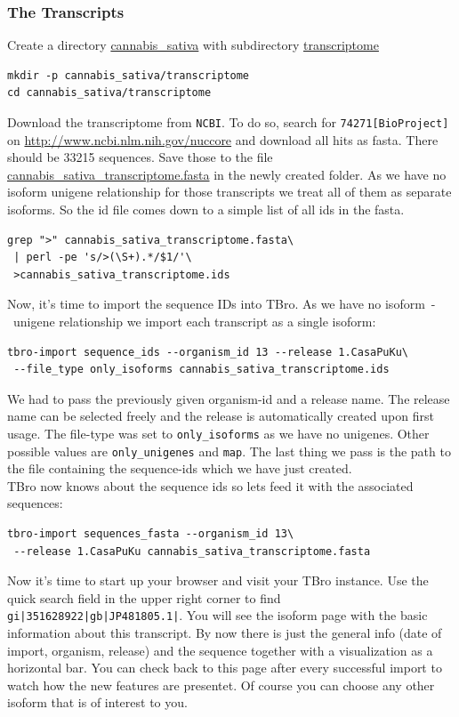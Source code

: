 \documentclass[english]{scrartcl}
\begin{document}
\subsubsection{The Transcripts}
Create a directory \url{cannabis_sativa} with subdirectory \url{transcriptome} 
\begin{lstlisting}[style=Bash]
mkdir -p cannabis_sativa/transcriptome 
cd cannabis_sativa/transcriptome
\end{lstlisting}
Download the  transcriptome from \texttt{NCBI}. To do so, search for
\texttt{74271[BioProject]} on \url{http://www.ncbi.nlm.nih.gov/nuccore} and
download all hits as fasta. There should be \num{33215} sequences. Save those to
the file \url{cannabis_sativa_transcriptome.fasta} in the newly created folder.
As we have no isoform unigene relationship for those transcripts we treat all
of them as separate isoforms. So the id file comes down to a simple list of all
ids in the fasta.
\begin{lstlisting}[style=Bash]
grep ">" cannabis_sativa_transcriptome.fasta\
 | perl -pe 's/>(\S+).*/$1/'\
 >cannabis_sativa_transcriptome.ids
\end{lstlisting} 
Now, it's time to import the sequence IDs into TBro. As we have no
isoform~-~unigene relationship we import each transcript as a single isoform:
\begin{lstlisting}[style=Bash]
tbro-import sequence_ids --organism_id 13 --release 1.CasaPuKu\
 --file_type only_isoforms cannabis_sativa_transcriptome.ids
\end{lstlisting} 
We had to pass the previously given organism-id and a release name. The release
name can be selected freely and the release is automatically created upon first
usage. The file-type was set to \texttt{only\_isoforms} as we have no unigenes.
Other possible values are \texttt{only\_unigenes} and \texttt{map}. The last
thing we pass is the path to the file containing the sequence-ids which we have
just created.\\
TBro now knows about the sequence ids so lets feed it with the associated
sequences:
\begin{lstlisting}[style=Bash]
tbro-import sequences_fasta --organism_id 13\
 --release 1.CasaPuKu cannabis_sativa_transcriptome.fasta
\end{lstlisting} 
Now it's time to start up your browser and visit your TBro instance. Use the
quick search field in the upper right corner to find
\texttt{gi|351628922|gb|JP481805.1|}. You will see the isoform page with the
basic information about this transcript. By now there is just the general info
(date of import, organism, release) and the sequence together with a
visualization as a horizontal bar. You can check back to this page after every
successful import to watch how the new features are presentet. Of course you can
choose any other isoform that is of interest to you.
\end{document}
